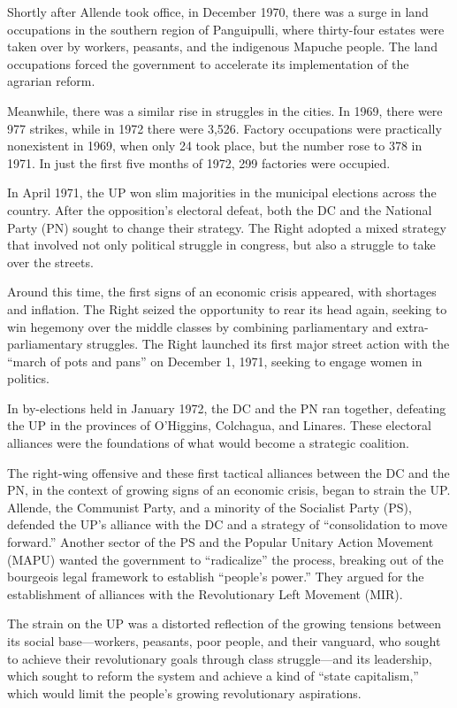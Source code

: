 Shortly after Allende took office, in December 1970, there was a surge in land occupations in the southern region of Panguipulli, where thirty-four estates were taken over by workers, peasants, and the indigenous Mapuche people. The land occupations forced the government to accelerate its implementation of the agrarian reform.

Meanwhile, there was a similar rise in struggles in the cities. In 1969, there were 977 strikes, while in 1972 there were 3,526. Factory occupations were practically nonexistent in 1969, when only 24 took place, but the number rose to 378 in 1971. In just the first five months of 1972, 299 factories were occupied.

In April 1971, the UP won slim majorities in the municipal elections across the country. After the opposition's electoral defeat, both the DC and the National Party (PN) sought to change their strategy. The Right adopted a mixed strategy that involved not only political struggle in congress, but also a struggle to take over the streets.

Around this time, the first signs of an economic crisis appeared, with shortages and inflation. The Right seized the opportunity to rear its head again, seeking to win hegemony over the middle classes by combining parliamentary and extra-parliamentary struggles. The Right launched its first major street action with the ``march of pots and pans'' on December 1, 1971, seeking to engage women in politics.

In by-elections held in January 1972, the DC and the PN ran together, defeating the UP in the provinces of O'Higgins, Colchagua, and Linares. These electoral alliances were the foundations of what would become a strategic coalition.

The right-wing offensive and these first tactical alliances between the DC and the PN, in the context of growing signs of an economic crisis, began to strain the UP. Allende, the Communist Party, and a minority of the Socialist Party (PS), defended the UP's alliance with the DC and a strategy of ``consolidation to move forward.'' Another sector of the PS and the Popular Unitary Action Movement (MAPU) wanted the government to ``radicalize'' the process, breaking out of the bourgeois legal framework to establish ``people's power.'' They argued for the establishment of alliances with the Revolutionary Left Movement (MIR).

The strain on the UP was a distorted reflection of the growing tensions between its social base---workers, peasants, poor people, and their vanguard, who sought to achieve their revolutionary goals through class struggle---and its leadership, which sought to reform the system and achieve a kind of ``state capitalism,'' which would limit the people's growing revolutionary aspirations.

